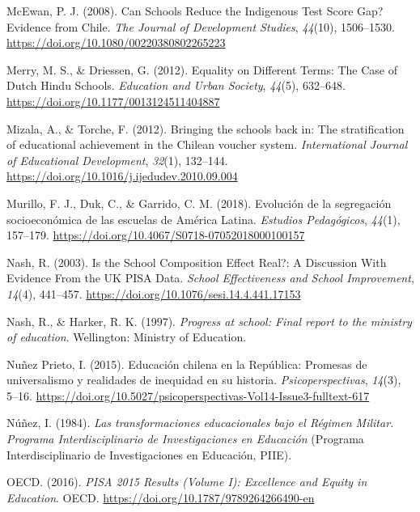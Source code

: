 \documentclass[
]{article}
\begin{document}
\leavevmode\hypertarget{ref-mcewan_can_2008}{}%
McEwan, P. J. (2008). Can Schools Reduce the Indigenous Test Score Gap?
Evidence from Chile. \emph{The Journal of Development Studies},
\emph{44}(10), 1506--1530.
\url{https://doi.org/10.1080/00220380802265223}

\leavevmode\hypertarget{ref-merry_equality_2012}{}%
Merry, M. S., \& Driessen, G. (2012). Equality on Different Terms: The
Case of Dutch Hindu Schools. \emph{Education and Urban Society},
\emph{44}(5), 632--648. \url{https://doi.org/10.1177/0013124511404887}

\leavevmode\hypertarget{ref-mizala_bringing_2012}{}%
Mizala, A., \& Torche, F. (2012). Bringing the schools back in: The
stratification of educational achievement in the Chilean voucher system.
\emph{International Journal of Educational Development}, \emph{32}(1),
132--144. \url{https://doi.org/10.1016/j.ijedudev.2010.09.004}

\leavevmode\hypertarget{ref-murillo_evolucion_2018}{}%
Murillo, F. J., Duk, C., \& Garrido, C. M. (2018). Evolución de la
segregación socioeconómica de las escuelas de América Latina.
\emph{Estudios Pedagógicos}, \emph{44}(1), 157--179.
\url{https://doi.org/10.4067/S0718-07052018000100157}

\leavevmode\hypertarget{ref-nash_school_2003}{}%
Nash, R. (2003). Is the School Composition Effect Real?: A Discussion
With Evidence From the UK PISA Data. \emph{School Effectiveness and
School Improvement}, \emph{14}(4), 441--457.
\url{https://doi.org/10.1076/sesi.14.4.441.17153}

\leavevmode\hypertarget{ref-nash_progress_1997}{}%
Nash, R., \& Harker, R. K. (1997). \emph{Progress at school: Final
report to the ministry of education}. Wellington: Ministry of Education.

\leavevmode\hypertarget{ref-nunezprieto_educacion_2015}{}%
Nuñez Prieto, I. (2015). Educación chilena en la República: Promesas de
universalismo y realidades de inequidad en su historia.
\emph{Psicoperspectivas}, \emph{14}(3), 5--16.
\url{https://doi.org/10.5027/psicoperspectivas-Vol14-Issue3-fulltext-617}

\leavevmode\hypertarget{ref-nunez_transformaciones_1984}{}%
Núñez, I. (1984). \emph{Las transformaciones educacionales bajo el
Régimen Militar. Programa Interdisciplinario de Investigaciones en
Educación} (Programa Interdisciplinario de Investigaciones en Educación,
PIIE).

\leavevmode\hypertarget{ref-oecd_pisa_2016}{}%
OECD. (2016). \emph{PISA 2015 Results (Volume I): Excellence and Equity
in Education}. OECD. \url{https://doi.org/10.1787/9789264266490-en}
\end{document}
